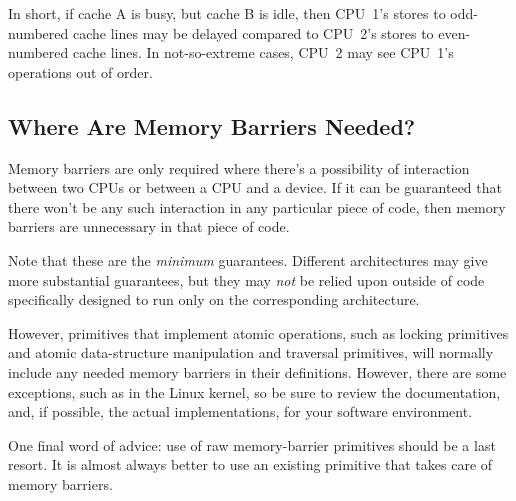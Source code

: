 In short, if cache A is busy, but cache B is idle, then CPU~1's
stores to odd-numbered cache lines may be delayed compared to
CPU~2's stores to even-numbered cache lines.
In not-so-extreme cases, CPU~2 may see CPU~1's operations out
of order.

	 {}

\subsection{Where Are Memory Barriers Needed?}
\label{sec:advsync:Where Are Memory Barriers Needed?}

Memory barriers are only required where there's a possibility of interaction
between two CPUs or between a CPU and a device.  If it can be guaranteed that
there won't be any such interaction in any particular piece of code, then
memory barriers are unnecessary in that piece of code.

Note that these are the \emph{minimum} guarantees.
Different architectures may give
more substantial guarantees,
but they may \emph{not}
be relied upon outside of code specifically designed to run only on
the corresponding architecture.

However, primitives that implement atomic operations, such as locking
primitives and atomic data-structure manipulation and traversal primitives,
will normally include any needed memory barriers in their definitions.
However, there are some exceptions, such as  in the
Linux kernel, so be sure to review the documentation, and, if possible,
the actual implementations, for your software environment.

One final word of advice: use of raw memory-barrier primitives should
be a last resort.
It is almost always better to use an existing primitive that takes
care of memory barriers.
